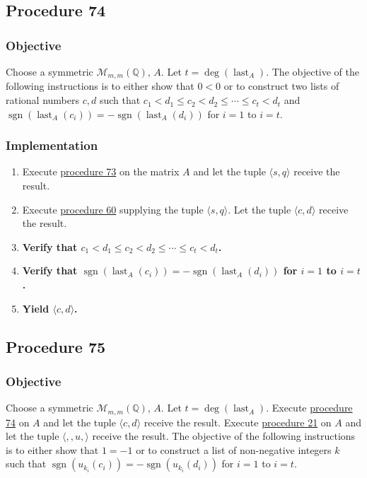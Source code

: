 \documentclass[twocolumn]{article}
\DeclareMathOperator{\sgn}{sgn}
\DeclareMathOperator{\last}{last}
\begin{document}
		\subsection{Procedure 74}\label{sec:procedure 74}
			\subsubsection{Objective}
				Choose a symmetric $\mathcal{M}_{m,m}(\mathbb{Q})$, $A$. Let $t=\deg(\last_A)$. The objective of the following instructions is to either show that $0<0$ or to construct two lists of rational numbers $c,d$ such that $c_1<d_1\le c_2<d_2\le\cdots\le c_t<d_t$ and $\sgn(\last_A(c_i))=-\sgn(\last_A(d_i))$ for $i=1$ to $i=t$.
			\subsubsection{Implementation}
				\begin{enumerate}
					\item Execute \hyperref[sec:procedure 73]{procedure 73} on the matrix $A$ and let the tuple $\langle s,q\rangle$ receive the result.
					\item Execute \hyperref[sec:procedure 60]{procedure 60} supplying the tuple $\langle s,q\rangle$. Let the tuple $\langle c,d\rangle$ receive the result.
					\item \textbf{Verify that $c_1<d_1\le c_2<d_2\le\cdots\le c_t<d_t$.}
					\item \textbf{Verify that $\sgn(\last_A(c_i))=-\sgn(\last_A(d_i))$ for $i=1$ to $i=t$.}
					\item \textbf{Yield $\langle c,d\rangle$.}
				\end{enumerate}
		\subsection{Procedure 75}\label{sec:procedure 75}
			\subsubsection{Objective}
				Choose a symmetric $\mathcal{M}_{m,m}(\mathbb{Q})$, $A$. Let $t=\deg(\last_A)$. Execute \hyperref[sec:procedure 74]{procedure 74} on $A$ and let the tuple $\langle c,d\rangle$ receive the result. Execute \hyperref[sec:procedure 21]{procedure 21} on $A$ and let the tuple $\langle,,u,\rangle$ receive the result. The objective of the following instructions is to either show that $1=-1$ or to construct a list of non-negative integers $k$ such that $\sgn(u_{k_i}(c_i))=-\sgn(u_{k_i}(d_i))$ for $i=1$ to $i=t$.
\end{document}
